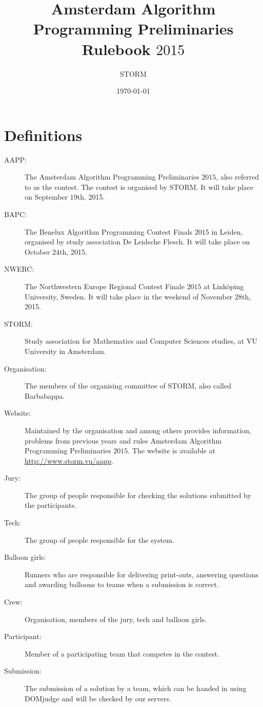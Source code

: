 \documentclass[11pt]{report}
\title{Amsterdam Algorithm Programming Preliminaries Rulebook $2015$}
\author{STORM}
\date{\today}
\begin{document}
\maketitle
\tableofcontents
\clearpage

\chapter{Definitions}
\begin{description}
\item[AAPP:]
The Amsterdam Algorithm Programming Preliminaries $2015$, also referred to as the contest. The contest is organised by STORM. It will take place on September $19$th, 2015.

\item[BAPC:]
The Benelux Algorithm Programming Contest Finals $2015$ in Leiden, organised by study association De Leidsche Flesch. It will take place on October $24$th, 2015.

\item[NWERC:]
The Northwestern Europe Regional Contest Finale $2015$ at Link\"oping University, Sweden. It will take place in the weekend of November $28$th, 2015.

\item[STORM:]
Study association for Mathematics and Computer Sciences studies, at VU University in Amsterdam.

\item[Organisation:]
The members of the organising committee of STORM, also called Barbabappa.

\item[Website:]
Maintained by the organisation and among others provides information, problems from previous years and rules Amsterdam Algorithm Programming Preliminaries $2015$. The website is available at \url{http://www.storm.vu/aapp}.

\item[Jury:]
The group of people responsible for checking the solutions submitted by the participants.

\item[Tech:]
The group of people responsible for the system.

\item[Balloon girls:]
Runners who are responsible for delivering print-outs, answering questions and awarding balloons to teams when a submission is correct.

\item[Crew:]
Organisation, members of the jury, tech and balloon girls. 

\item[Participant:]
Member of a participating team that competes in the contest. 

\item[Submission:]
The submission of a solution by a team, which can be handed in using DOMjudge and will be checked by our servers.
\end{description}
\end{document}
